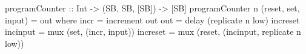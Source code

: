 \begin{haskellcode}
    programCounter :: Int -> (SB, SB, [SB]) -> [SB]
    programCounter n (reset, set, input) = out
        where
            incr     = increment out
            out      = delay (replicate n low) increset
            incinput = mux (set, (incr, input))
            increset = mux (reset, (incinput, replicate n low))
\end{haskellcode}
